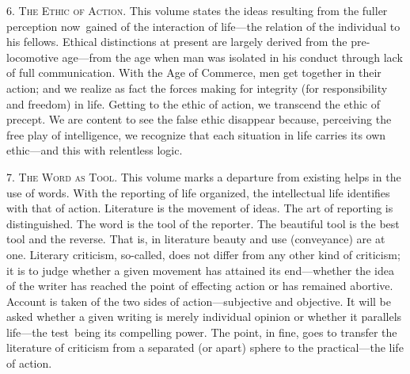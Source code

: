 \documentclass[twoside,symmetric,nobib,justified]{tufte-book}
\begin{document}
\vspace{0.05in}

6. \textsc{The Ethic of Action}. This volume states the ideas resulting from the
fuller perception now~gained of the interaction of life---the relation
of the individual to his fellows. Ethical distinctions at present are
largely derived from the pre-locomotive age---from the age when man was
isolated in his conduct through lack of full communication. With the Age
of Commerce, men get together in their action; and we realize as fact
the forces making for integrity (for responsibility and freedom) in
life. Getting to the ethic of action, we transcend the ethic of precept.
We are content to see the false ethic disappear because, perceiving the
free play of intelligence, we recognize that each situation in life
carries its own ethic---and this with relentless logic.~

\vspace{0.05in}

7. \textsc{The Word as Tool}. This volume marks a departure from existing helps
in the use of words. With the reporting of life organized, the
intellectual life identifies with that of action. Literature is the
movement of ideas. The art of reporting is distinguished. The word is
the tool of the reporter. The beautiful tool is the best tool and the
reverse. That is, in literature beauty and use (conveyance) are at one.
Literary criticism, so-called, does not differ from any other kind of
criticism; it is to judge whether a given movement has attained its
end---whether the idea of the writer has reached the point of effecting
action or has remained abortive. Account is taken of the two sides of
action---subjective and objective. It will be asked whether a given
writing is merely individual opinion or whether it parallels life---the
test~being its compelling power. The point, in fine, goes to transfer
the literature of criticism from a separated (or apart) sphere to the
practical---the life of action.~

\vspace{0.05in}
\end{document}
